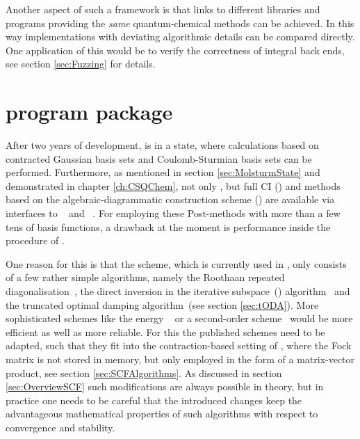Another aspect of such a framework is
that links to different libraries and programs
providing the \emph{same} quantum-chemical methods can be achieved.
In this way implementations with deviating algorithmic details
can be compared directly.
One application of this would be to verify the correctness
of integral back ends, see section \ref{sec:Fuzzing} for details.

%
%
\section{\molsturm program package}
\label{sec:newMolsturm}
After two years of development,
\molsturm is in a state,
where calculations based on contracted Gaussian basis sets
and Coulomb-Sturmian basis sets can be performed.
Furthermore, as mentioned in section \vref{sec:MolsturmState}
and demonstrated in chapter \vref{ch:CSQChem},
not only \HF, but full CI (\FCI) and
methods based on the algebraic-diagrammatic construction scheme (\ADC)
are available via interfaces to \pyscf~\cite{Sun2017} and \adcman~\cite{Wormit2014}.
For employing these Post-\HF methods
with more than a few tens of basis functions,
a drawback at the moment is performance
inside the \SCF procedure of \molsturm.

One reason for this is that the \SCF scheme,
which is currently used in \molsturm,
only consists of a few rather simple algorithms,
namely the Roothaan repeated diagonalisation~\cite{Roothaan1951},
the direct inversion in the iterative subspace~(\DIIS) algorithm~\cite{Pulay1982}
and the truncated optimal damping algorithm~(see section \ref{sec:tODA}).
More sophisticated schemes
like the energy \DIIS~\cite{Kudin2002}
or a second-order \SCF scheme~\cite{Salek2007,Hoest2008}
would be more efficient as well as more reliable.
For this the published schemes need to be adapted,
such that they fit into the contraction-based setting of \molsturm,
where the Fock matrix is not stored in memory,
but only employed in the form of a matrix-vector product,
see section \vref{sec:SCFAlgorithms}.
As discussed in section \vref{sec:OverviewSCF}
such modifications are always possible in theory,
but in practice one needs to be careful
that the introduced changes
keep the advantageous mathematical properties of such algorithms
with respect to convergence and stability.

